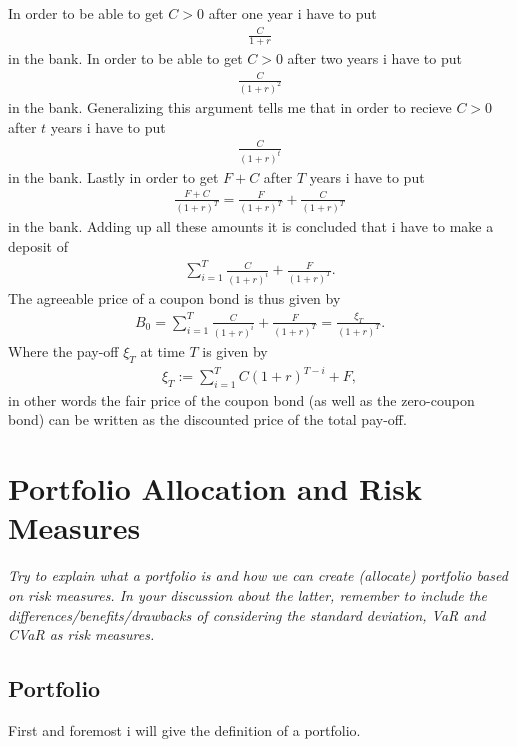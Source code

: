 \documentclass{article}
\theoremstyle{definition}
\numberwithin{equation}{section}
\begin{document}
In order to be able to get $C > 0$ after one year i have to put
\begin{align}
    \frac{C}{1+r}
\end{align}
in the bank.
In order to be able to get $C > 0$ after two years i have to put 
\begin{align}
    \frac{C}{(1+r)^2}
\end{align}
in the bank.
Generalizing this argument tells me that in order to recieve $C > 0$ after $t$ years i have to put
\begin{align}
    \frac{C}{(1+r)^t}
\end{align}
in the bank.
Lastly in order to get $F + C$ after $T$ years i have to put
\begin{align}
    \frac{F + C}{(1+r)^T} = \frac{F}{(1+r)^T} + \frac{C}{(1+r)^T}
\end{align}
in the bank.
Adding up all these amounts it is concluded that i have to make a deposit of
\begin{align}
    \sum_{i = 1}^T \frac{C}{(1 + r)^i} + \frac{F}{(1+r)^T}.
\end{align}
The agreeable price of a coupon bond is thus given by
\begin{align}
    B_0 = 
    \sum_{i = 1}^T \frac{C}{(1 + r)^i} + \frac{F}{(1+r)^T} =
    \frac{\xi_T}{(1 + r)^T}.
\end{align}
Where the pay-off $\xi_T$ at time $T$ is given by
\begin{align}
    \xi_T := \sum_{i = 1}^T C(1 + r)^{T -i} + F,
\end{align}
in other words the fair price of the coupon bond (as well as the zero-coupon bond) can be written as the discounted price of the total pay-off.
\newpage

\section{Portfolio Allocation and Risk Measures}
\textit{Try to explain what a portfolio is and how we can create (allocate) portfolio based on risk measures. In your discussion about the latter, remember to include the differences/benefits/drawbacks of considering the standard deviation, VaR and CVaR as risk measures.}

\subsection{Portfolio}
First and foremost i will give the definition of a portfolio.
\end{document}
